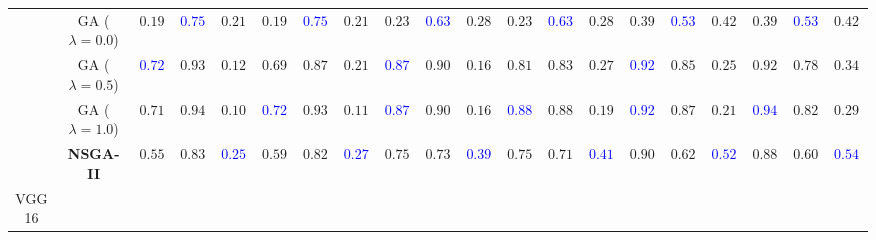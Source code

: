 \begin{table}[t]
{\begin{tabular}{cc|cccccc|cccccc|cccccc}
& GA ($\lambda=0.0$)
& $0.1900$ & \textbf{\textcolor{blue}{$0.7538$}} & $0.2145$ & $0.1900$ & \textbf{\textcolor{blue}{$0.7538$}} & $0.2145$ & $0.2300$ & \textbf{\textcolor{blue}{$0.6332$}} & $0.2827$ & $0.2300$ & \textbf{\textcolor{blue}{$0.6332$}} & $0.2827$ & $0.3900$ & \textbf{\textcolor{blue}{$0.5349$}} & $0.4243$ & $0.3900$ & \textbf{\textcolor{blue}{$0.5349$}} & $0.4243$ \\
& GA ($\lambda=0.5$)
& \textbf{\textcolor{blue}{$0.7200$}} & $0.9323$ & $0.1238$ & $0.6900$ & $0.8733$ & $0.2140$ & \textbf{\textcolor{blue}{$0.8700$}} & $0.9099$ & $0.1633$ & $0.8100$ & $0.8348$ & $0.2744$ & \textbf{\textcolor{blue}{$0.9200$}} & $0.8514$ & $0.2559$ & $0.9200$ & $0.7878$ & $0.3449$ \\
& GA ($\lambda=1.0$)
& $0.7100$ & $0.9406$ & $0.1096$ & \textbf{\textcolor{blue}{$0.7200$}} & $0.9399$ & $0.1109$ & \textbf{\textcolor{blue}{$0.8700$}} & $0.9088$ & $0.1650$ & \textbf{\textcolor{blue}{$0.8800$}} & $0.8880$ & $0.1987$ & \textbf{\textcolor{blue}{$0.9200$}} & $0.8778$ & $0.2157$ & \textbf{\textcolor{blue}{$0.9400$}} & $0.8234$ & $0.2974$ \\
& \textbf{NSGA-II}
& $0.5500$ & $0.8339$ & \textbf{\textcolor{blue}{$0.2551$}} & $0.5900$ & $0.8246$ & \textbf{\textcolor{blue}{$0.2704$}} & $0.7500$ & $0.7308$ & \textbf{\textcolor{blue}{$0.3962$}} & $0.7500$ & $0.7170$ & \textbf{\textcolor{blue}{$0.4109$}} & $0.9000$ & $0.6279$ & \textbf{\textcolor{blue}{$0.5266$}} & $0.8800$ & $0.6017$ & \textbf{\textcolor{blue}{$0.5484$}} \\

\midrule

\multirow{4}{*}{VGG16}


\end{tabular}}
\end{table}
